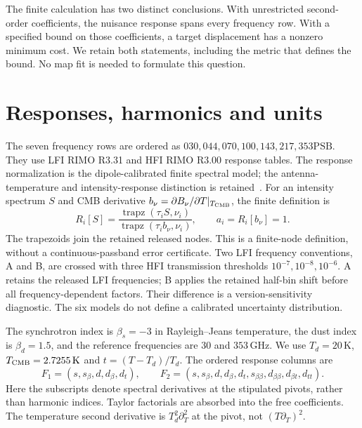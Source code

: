 \documentclass[aps,prd,onecolumn,11pt,nofootinbib,notitlepage]{revtex4-2}
\begin{document}
The finite calculation has two distinct conclusions. With unrestricted second-order coefficients, the nuisance response spans every frequency row. With a specified bound on those coefficients, a target displacement has a nonzero minimum cost. We retain both statements, including the metric that defines the bound. No map fit is needed to formulate this question.

\section{Responses, harmonics and units}

The seven frequency rows are ordered as $030,044,070,100,143,217,353\mathrm{PSB}$. They use LFI RIMO R3.31 and HFI RIMO R3.00 response tables. The response normalization is the dipole-calibrated finite spectral model; the antenna-temperature and intensity-response distinction is retained~\cite{PlanckLFI2013}. For an intensity spectrum $S$ and CMB derivative $b_\nu=\partial B_\nu/\partial T|_{T_{\rm CMB}}$, the finite definition is
\begin{equation}
 R_i[S]=\frac{\operatorname{trapz}(\tau_i S,\nu_i)}{\operatorname{trapz}(\tau_i b_\nu,\nu_i)},\qquad
 a_i=R_i[b_\nu]=1.
 \label{eq:response}
\end{equation}
The trapezoids join the retained released nodes. This is a finite-node definition, without a continuous-passband error certificate. Two LFI frequency conventions, A and B, are crossed with three HFI transmission thresholds $10^{-7},10^{-8},10^{-6}$. A retains the released LFI frequencies; B applies the retained half-bin shift before all frequency-dependent factors. Their difference is a version-sensitivity diagnostic. The six models do not define a calibrated uncertainty distribution.

The synchrotron index is $\beta_s=-3$ in Rayleigh--Jeans temperature, the dust index is $\beta_d=1.5$, and the reference frequencies are $30$ and $353\,\mathrm{GHz}$. We use $T_d=20\,\mathrm K$, $T_{\rm CMB}=2.7255\,\mathrm K$ and $t=(T-T_d)/T_d$. The ordered response columns are
\begin{equation}
 F_1=(s,s_\beta,d,d_\beta,d_t),\qquad
 F_2=(s,s_\beta,d,d_\beta,d_t,s_{\beta\beta},d_{\beta\beta},d_{\beta t},d_{tt}).
 \label{eq:columns}
\end{equation}
Here the subscripts denote spectral derivatives at the stipulated pivots, rather than harmonic indices. Taylor factorials are absorbed into the free coefficients. The temperature second derivative is $T_d^2\partial_T^2$ at the pivot, not $(T\partial_T)^2$.
\end{document}
